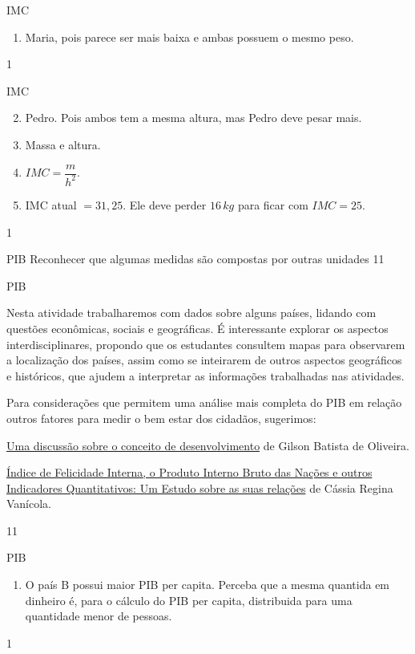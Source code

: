 \begin{answer}{IMC}
{
\begin{enumerate}
\item {} 
Maria, pois parece ser mais baixa e ambas possuem o mesmo peso.
\end{enumerate}
}{1}
\end{answer}
\clearmargin
\begin{answer}{IMC}
{
\begin{enumerate}\setcounter{enumi}{1}
\item {} 
Pedro. Pois ambos tem a mesma altura, mas  Pedro deve pesar mais.

\item {} 
Massa e altura.

\item {} 
\(IMC = \dfrac{m}{h^2}\).

\item {} 
IMC atual \(=31,25\). Ele deve perder \(16\,kg\) para ficar com \(IMC=25\).
\end{enumerate}
}{1}
\end{answer}
\clearmargin
\begin{objectives}{PIB}
{
Reconhecer que algumas medidas são compostas por outras unidades
}{1}{1}
\end{objectives}
\begin{sugestions}{PIB}
{
Nesta atividade trabalharemos com dados sobre alguns países, lidando com questões econômicas, sociais e geográficas.  É interessante explorar os aspectos interdisciplinares, propondo que os estudantes consultem mapas para observarem a localização dos países, assim como se inteirarem de outros aspectos geográficos e históricos, que ajudem a interpretar as informações trabalhadas nas atividades.

Para considerações que permitem uma análise mais completa do PIB em relação outros fatores para medir o bem estar dos cidadãos, sugerimos:

\href{https://revistafae.fae.edu/revistafae/article/view/477}{Uma discussão sobre o conceito de desenvolvimento} de Gilson Batista de Oliveira.

\href{https://www.aedb.br/seget/arquivos/artigos08/323\_Indice\%20de\%20Felicidade\%20Interna\_SEGeT.pdf}{Índice de Felicidade Interna, o Produto Interno Bruto das Nações e outros Indicadores Quantitativos: Um Estudo sobre as suas relações} de Cássia Regina Vanícola.
}{1}{1}
\end{sugestions}
\begin{answer}{PIB}
{
\begin{enumerate}
\item O país B possui maior PIB per capita. Perceba que a mesma quantida em dinheiro é, para o cálculo do PIB per capita, distribuida para uma quantidade menor de pessoas.
\end{enumerate}
}{1}
\end{answer}
